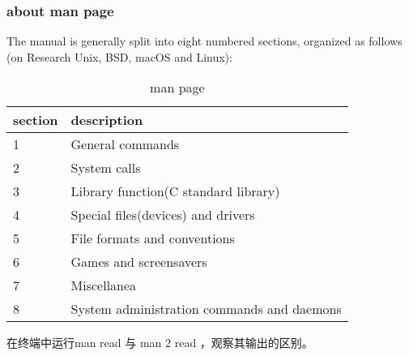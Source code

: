 \documentclass{beamer}
\begin{document}
\begin{frame}
\frametitle{about man page}
The manual is generally split into eight numbered sections, organized as follows (on Research Unix, BSD, macOS and Linux):
\begin{table}
\begin{tabular}{ll}
\toprule
\textbf{section} & \textbf{description} \\
\midrule
1 & General commands\\
 2 & System calls\\
 3& Library function(C standard library)\\
 4 & Special files(devices) and drivers\\
  5 & File formats and conventions\\
  6  & Games and screensavers\\
   7  & Miscellanea\\
   8   & System administration commands and daemons\\  
\bottomrule
\end{tabular}
\caption{man page}
\end{table}

在终端中运行man read 与 man 2 read ，观察其输出的区别。
\end{frame}
\end{document}
